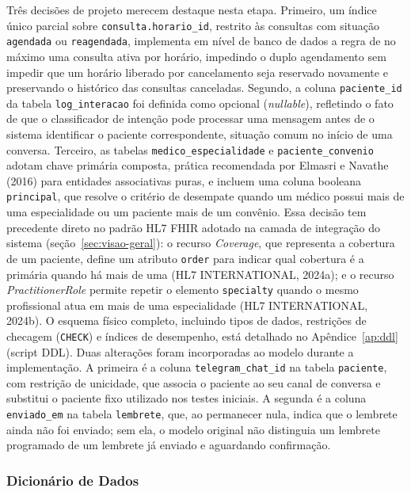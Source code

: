 \documentclass[12pt,a4paper]{extarticle}
\begin{document}
Três decisões de projeto merecem destaque nesta etapa. Primeiro, um índice único parcial sobre \texttt{consulta.horario\_\allowbreak{}id}, restrito às consultas com situação \texttt{agendada} ou \texttt{reagendada}, implementa em nível de banco de dados a regra de no máximo uma consulta ativa por horário, impedindo o duplo agendamento sem impedir que um horário liberado por cancelamento seja reservado novamente e preservando o histórico das consultas canceladas. Segundo, a coluna \texttt{paciente\_\allowbreak{}id} da tabela \texttt{log\_\allowbreak{}interacao} foi definida como opcional (\textit{nullable}), refletindo o fato de que o classificador de intenção pode processar uma mensagem antes de o sistema identificar o paciente correspondente, situação comum no início de uma conversa. Terceiro, as tabelas \texttt{medico\_\allowbreak{}especialidade} e \texttt{paciente\_\allowbreak{}convenio} adotam chave primária composta, prática recomendada por Elmasri e Navathe (2016) para entidades associativas puras, e incluem uma coluna booleana \texttt{principal}, que resolve o critério de desempate quando um médico possui mais de uma especialidade ou um paciente mais de um convênio. Essa decisão tem precedente direto no padrão HL7 FHIR adotado na camada de integração do sistema (seção~\ref{sec:visao-geral}): o recurso \textit{Coverage}, que representa a cobertura de um paciente, define um atributo \texttt{order} para indicar qual cobertura é a primária quando há mais de uma (HL7 INTERNATIONAL, 2024a); e o recurso \textit{PractitionerRole} permite repetir o elemento \texttt{specialty} quando o mesmo profissional atua em mais de uma especialidade (HL7 INTERNATIONAL, 2024b). O esquema físico completo, incluindo tipos de dados, restrições de checagem (\texttt{CHECK}) e índices de desempenho, está detalhado no Apêndice~\ref{ap:ddl} (script DDL). Duas alterações foram incorporadas ao modelo durante a implementação. A primeira é a coluna \texttt{telegram\_\allowbreak{}chat\_\allowbreak{}id} na tabela \texttt{paciente}, com restrição de unicidade, que associa o paciente ao seu canal de conversa e substitui o paciente fixo utilizado nos testes iniciais. A segunda é a coluna \texttt{enviado\_\allowbreak{}em} na tabela \texttt{lembrete}, que, ao permanecer nula, indica que o lembrete ainda não foi enviado; sem ela, o modelo original não distinguia um lembrete programado de um lembrete já enviado e aguardando confirmação.

\subsubsection{Dicionário de Dados}
\end{document}

